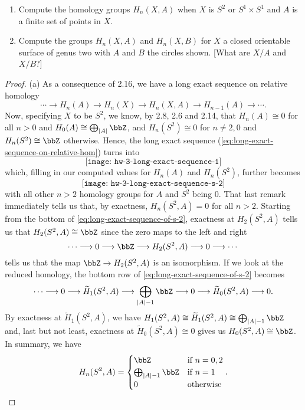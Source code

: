 \begin{problem}[Hatcher {\S}2.1, Ex.\@ 17]
\begin{enumerate}[label=(\alph*)]
\item Compute the homology groups $H_n(X,A)$ when $X$ is $S^2$ or
  $S^1\times S^1$ and $A$ is a finite set of points in $X$.
\item Compute the groups $H_n(X,A)$ and $H_n(X,B)$ for $X$ a closed
  orientable surface of genus two with $A$ and $B$ the circles shown. [What
  are $X/A$ and $X/B$?]
\end{enumerate}
\end{problem}
\begin{proof}
(a) As a consequence of 2.16, we have a long exact sequence on relative
homology
\begin{equation}
\label{eq:long-exact-sequence-on-relative-hom}
\cdots\longrightarrow
H_n(A)\longrightarrow
H_n(X)\longrightarrow
H_n(X,A)\longrightarrow
H_{n-1}(A)\longrightarrow
\cdots.
\end{equation}
Now, specifying $X$ to be $S^2$, we know, by 2.8, 2.6 and 2.14, that
$H_n(A)\cong 0$ for all $n>0$ and $H_0(A)\cong \bigoplus_{|A|}\bbZ$, and
$H_n(S^2)\cong 0$ for $n\neq 2,0$ and $H_n(S^2)\cong\bbZ$ otherwise. Hence,
the long exact sequence (\ref{eq:long-exact-sequence-on-relative-hom})
turns into
\begin{equation}
\label{eq:long-exact-sequence}
\texttt{[image: hw-3-long-exact-sequence-1]}
\end{equation}
which, filling in our computed values for $H_n(A)$ and $H_n(S^2)$, further
becomes
\begin{equation}
\label{eq:long-exact-sequence-of-s-2}
\texttt{[image: hw-3-long-exact-sequence-s-2]}
\end{equation}
with all other $n>2$ homology groups for $A$ and $S^2$ being $0$. That last
remark immediately tells us that, by exactness, $H_n(S^2,A)=0$ for all
$n>2$. Starting from the bottom of \eqref{eq:long-exact-sequence-of-s-2},
exactness at $H_2(S^2,A)$ tells us that $H_2(S^2,A)\cong\bbZ$ since the
zero maps to the left and right
\[
\cdots\longrightarrow 0\longrightarrow \bbZ\longrightarrow H_2(S^2,A)\longrightarrow 0\longrightarrow\cdots
\]
tells us that the map $\bbZ\to H_2(S^2,A)$ is an isomorphism. If we look at
the reduced homology, the bottom row of
\eqref{eq:long-exact-sequence-of-s-2} becomes
\[
\cdots\longrightarrow
0\longrightarrow
\widetilde H_1(S^2,A)\longrightarrow
\bigoplus_{|A|-1}\bbZ\longrightarrow
0\longrightarrow\widetilde H_0(S^2,A)
\longrightarrow 0.
\]
By exactness at $\widetilde H_1(S^2,A)$, we have $H_1(S^2,A)\cong\widetilde
H_1(S^2,A)\cong\bigoplus_{|A|-1}\bbZ$ and, last but not least, exactness at
$\widetilde H_0(S^2,A)\cong 0$ gives us $H_0(S^2,A)\cong\bbZ$. In summary,
we have
\begin{equation}
  \label{eq:homology-of-s-2-a}
H_n(S^2,A)=
\begin{cases}
\bbZ&\text{if $n=0,2$}\\
\bigoplus_{|A|-1}\bbZ&\text{if $n=1$}\\
0&\text{otherwise}
\end{cases}.
\end{equation}


\end{proof}
